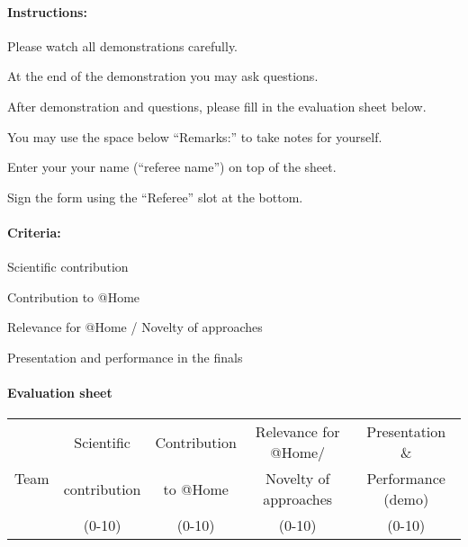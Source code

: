 \paragraph{Instructions:}
\begin{compactenum}
\item Please watch all demonstrations carefully.
\item At the end of the demonstration you may ask questions.
\item After demonstration and questions, please fill in the evaluation sheet below.
\item You may use the space below \enquote{Remarks:} to take notes for yourself.
\item Enter your your name (\enquote{referee name}) on top of the sheet.
\item Sign the form using the \enquote{Referee} slot at the bottom.
\end{compactenum}

\paragraph{Criteria:}
\begin{compactitem}
\item Scientific contribution
\item Contribution to @Home
\item Relevance for @Home / Novelty of approaches
\item Presentation and performance in the finals
\end{compactitem}



\paragraph{Evaluation sheet}
\begin{center}

\begingroup
\newcommand\tableTEAMS{}
\def\do#1{\appto\tableTEAMS{#1 & & & &  \\\hline}}%
\expandafter\docsvlist\expandafter{\TEAMSFINALS}

\begin{tabular}{|l|c|c|c|c|}
  \hline
  \multirow{3}{*}{Team}
  &  Scientific   & Contribution & Relevance for @Home/   &  Presentation \&  \\
  &  contribution & to @Home     & Novelty of approaches &  Performance (demo) \\
  &  (0-10)  &  (0-10) &  (0-10)   & (0-10) \\
  \hline
  \hline
  \tableTEAMS
\end{tabular}\\
\endgroup

\end{center}




